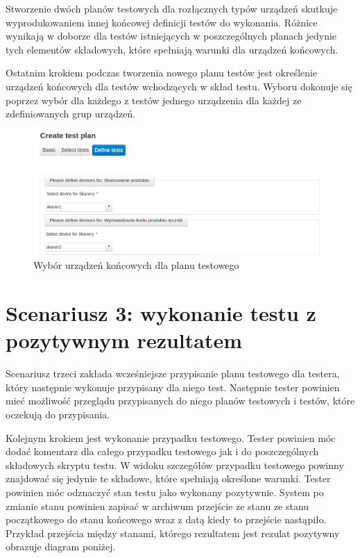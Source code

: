 Stworzenie dwóch planów testowych dla rozłącznych typów urządzeń skutkuje wyprodukowaniem innej końcowej definicji testów do wykonania. Różnice wynikają w doborze dla testów istniejących w poszczególnych planach jedynie tych elementów składowych, które spełniają warunki dla urządzeń końcowych.

Ostatnim krokiem podczas tworzenia nowego planu testów jest określenie urządzeń końcowych dla testów wchodzących w skład testu. Wyboru dokonuje się poprzez wybór dla każdego z testów jednego urządzenia dla każdej ze zdefiniowanych grup urządzeń.

  \begin{figure}[h]
  \begin{center}
    \includegraphics[scale=0.4]{img/screen/tworzeniePlanuWyborUrzadzen.png}
    \caption{Wybór urządzeń końcowych dla planu testowego}
    \label{fig:wyborUrzadzenDlaPlanu}
  \end{center}
\end{figure}

\section{Scenariusz 3: wykonanie testu z pozytywnym rezultatem}

Scenariusz trzeci zakłada wcześniejsze przypisanie planu testowego dla testera, który następnie wykonuje przypisany dla niego test. Następnie tester powinien mieć możliwość przeglądu przypisanych do niego planów testowych i testów, które oczekują do przypisania.

Kolejnym krokiem jest wykonanie przypadku testowego. Tester powinien móc dodać komentarz dla całego przypadku testowego jak i do poszczególnych składowych skryptu testu. W widoku szczegółów przypadku testowego powinny znajdować się jedynie te składowe, które spełniają określone warunki. Tester powinien móc odznaczyć stan testu jako wykonany pozytywnie. System po zmianie stanu powinien zapisać w archiwum przejście ze stanu ze stanu początkowego do stanu końcowego wraz z datą kiedy to przejście nastąpiło. Przykład przejścia między stanami, którego rezultatem jest rezulat pozytywny obrazuje diagram poniżej.


